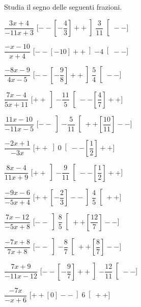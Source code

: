 \begin{esercizio}\label{ese:dis_7}
 Studia il segno delle seguenti frazioni.
\begin{multicols}{2}
 \begin{enumeratea}
  \item  $\dfrac{3 x +4}{-11 x +3}$ \hfill 
  [$--\left [-\dfrac{4}{3} \right ]++\left ]\dfrac{3}{11} \right [--$]
  \item  $\dfrac{- x -10}{x +4}$ \hfill 
  [$--\left [-10 \right ]++\left ]-4 \right [--$]
  \item  $\dfrac{-8 x -9}{4 x -5}$ \hfill 
  [$--\left [-\dfrac{9}{8} \right ]++\left ]\dfrac{5}{4} \right [--$]
  \item  $\dfrac{7 x -4}{5 x +11}$ \hfill 
  [$++\left ]-\dfrac{11}{5} \right [--\left [\dfrac{4}{7} \right ]++$]
  \item  $\dfrac{11 x -10}{-11 x -5}$ \hfill 
  [$--\left ]-\dfrac{5}{11} \right [++\left [\dfrac{10}{11} \right ]--$]
  \item  $\dfrac{-2 x +1}{-3 x }$ \hfill 
  [$++\left ]0 \right [--\left [\dfrac{1}{2} \right ]++$]
  \item  $\dfrac{8 x -4}{11 x +9}$ \hfill 
  [$++\left ]-\dfrac{9}{11} \right [--\left [\dfrac{1}{2} \right ]++$]
  \item  $\dfrac{-9 x -6}{-5 x +4}$ \hfill 
  [$++\left [-\dfrac{2}{3} \right ]--\left ]\dfrac{4}{5} \right [++$]
  \item  $\dfrac{7 x -12}{-5 x +8}$ \hfill 
  [$--\left ]\dfrac{8}{5} \right [++\left [\dfrac{12}{7} \right ]--$]
  \item  $\dfrac{-7 x +8}{7 x +8}$ \hfill 
  [$--\left ]-\dfrac{8}{7} \right [++\left [\dfrac{8}{7} \right ]--$]
  \item  $\dfrac{7 x +9}{-11 x -12}$ \hfill 
  [$--\left [-\dfrac{9}{7} \right ]++\left ]-\dfrac{12}{11} \right [--$]
  \item  $\dfrac{-7 x }{- x +6}$ \hfill 
  [$++\left [0 \right ]--\left ]6 \right [++$]
 \end{enumeratea}
\end{multicols}
\end{esercizio}

